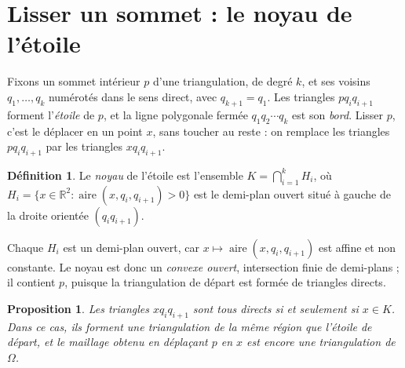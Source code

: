 \documentclass[11pt,a4paper]{article}
\theoremstyle{plain}
\newtheorem{proposition}[theoreme]{Proposition}
\theoremstyle{definition}
\newtheorem{definition}[theoreme]{Définition}
\theoremstyle{remark}
\newcommand{\R}{\mathbb{R}}
\DeclareMathOperator{\aire}{aire}
\begin{document}
\section{Lisser un sommet : le noyau de l'étoile}

Fixons un sommet intérieur $p$ d'une triangulation, de degré $k$, et ses voisins $q_1,\dots,q_k$ numérotés dans le sens direct, avec $q_{k+1}=q_1$. Les triangles $pq_iq_{i+1}$ forment l'\emph{étoile} de $p$, et la ligne polygonale fermée $q_1q_2\cdots q_k$ est son \emph{bord}. Lisser $p$, c'est le déplacer en un point $x$, sans toucher au reste : on remplace les triangles $pq_iq_{i+1}$ par les triangles $xq_iq_{i+1}$.

\begin{definition}\label{def:noyau}
Le \emph{noyau} de l'étoile est l'ensemble $K=\bigcap_{i=1}^kH_i$, où $H_i=\{x\in\R^2:\aire(x,q_i,q_{i+1})>0\}$ est le demi-plan ouvert situé à gauche de la droite orientée $(q_iq_{i+1})$.
\end{definition}

Chaque $H_i$ est un demi-plan ouvert, car $x\mapsto\aire(x,q_i,q_{i+1})$ est affine et non constante. Le noyau est donc un \emph{convexe ouvert}, intersection finie de demi-plans ; il contient $p$, puisque la triangulation de départ est formée de triangles directs.

\begin{proposition}\label{prop:noyau}
Les triangles $xq_iq_{i+1}$ sont tous directs si et seulement si $x\in K$. Dans ce cas, ils forment une triangulation de la même région que l'étoile de départ, et le maillage obtenu en déplaçant $p$ en $x$ est encore une triangulation de $\Omega$.
\end{proposition}
\end{document}
